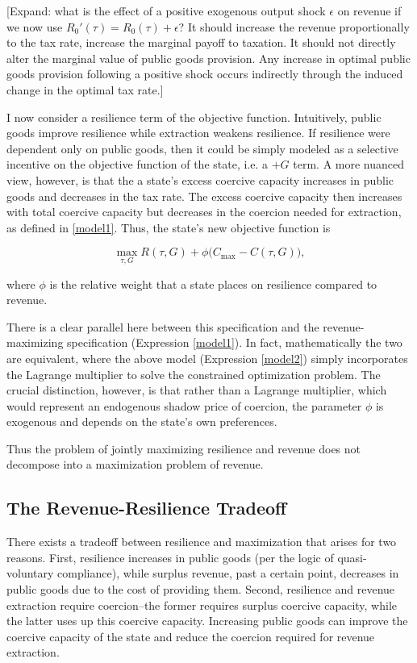 \documentclass[bibtex,nonblind]{apsr_submission}
\begin{document}
[Expand: what is the effect of a positive exogenous output shock $\epsilon$ on revenue if we now use $R_0'(\tau) = R_0(\tau) + \epsilon$? It should increase the revenue proportionally to the tax rate, increase the marginal payoff to taxation. It should not directly alter the marginal value of public goods provision. Any increase in optimal public goods provision following a positive shock occurs indirectly through the induced change in the optimal tax rate.]

I now consider a resilience term of the objective function. Intuitively, public goods improve resilience while extraction weakens resilience. If resilience were dependent only on public goods, then it could be simply modeled as a selective incentive on the objective function of the state, i.e. a $+G$ term. A more nuanced view, however, is that the a state's excess coercive capacity increases in public goods and decreases in the tax rate. The excess coercive capacity then increases with total coercive capacity but decreases in the coercion needed for extraction, as defined in \ref{model1}. Thus, the state's new objective function is

\begin{equation}\label{model2}
    \max_{\tau, G} R(\tau, G) + \phi\big(C_{\text{max}} - C(\tau, G)\big),
\end{equation}

where $\phi$ is the relative weight that a state places on resilience compared to revenue.

There is a clear parallel here between this specification and the revenue-maximizing specification (Expression \ref{model1}). In fact, mathematically the two are equivalent, where the above model (Expression \ref{model2}) simply incorporates the Lagrange multiplier to solve the constrained optimization problem. The crucial distinction, however, is that rather than a Lagrange multiplier, which would represent an endogenous shadow price of coercion, the parameter $\phi$ is exogenous and depends on the state's own preferences.

Thus the problem of jointly maximizing resilience and revenue does not decompose into a maximization problem of revenue.

\subsection{The Revenue-Resilience Tradeoff}

There exists a tradeoff between resilience and maximization that arises for two reasons. First, resilience increases in public goods (per the logic of quasi-voluntary compliance), while surplus revenue, past a certain point, decreases in public goods due to the cost of providing them. Second, resilience and revenue extraction require coercion--the former requires surplus coercive capacity, while the latter uses up this coercive capacity. Increasing public goods can improve the coercive capacity of the state and reduce the coercion required for revenue extraction.
\end{document}
